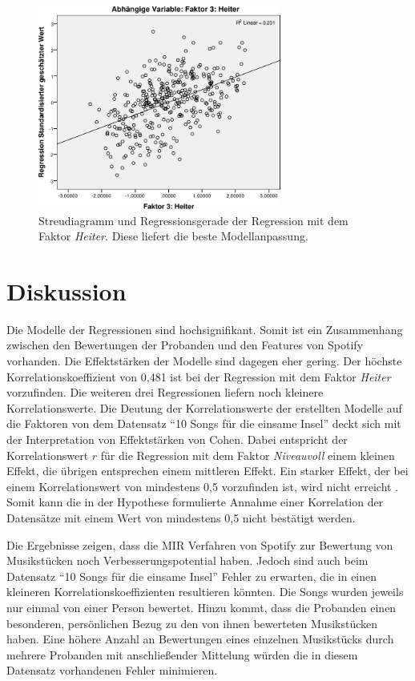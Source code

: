 \begin{figure}[hbt]
    \begin{center}
        \includegraphics[width=8cm]{images/StreudiagrammFak3.pdf}
    \end{center}
    \caption{Streudiagramm und Regressionsgerade der Regression mit dem Faktor \textit{Heiter}. Diese liefert die beste Modellanpassung.}
    \label{fig:Faktor3}
\end{figure}

\section*{Diskussion}
\label{sec:Diskussion}


Die Modelle der Regressionen sind hochsignifikant.
Somit ist ein Zusammenhang zwischen den Bewertungen der Probanden und den Features von Spotify vorhanden.
Die Effektstärken der Modelle sind dagegen eher gering. 
Der höchste Korrelationskoeffizient von 0,481 ist bei der Regression mit dem Faktor \textit{Heiter} vorzufinden. Die weiteren drei Regressionen liefern noch kleinere Korrelationswerte.
Die Deutung der Korrelationswerte der erstellten Modelle auf die Faktoren von dem Datensatz "`10 Songs für die einsame Insel"' deckt sich mit der Interpretation von Effektstärken von Cohen.
Dabei entspricht der Korrelationswert $r$ für die Regression mit dem Faktor \textit{Niveauvoll} einem kleinen Effekt, die übrigen entsprechen einem mittleren Effekt. 
Ein starker Effekt, der bei einem Korrelationswert von mindestens 0,5 vorzufinden ist, wird nicht erreicht \cite{cohen1988}.
Somit kann die in der Hypothese formulierte Annahme einer Korrelation der Datensätze mit einem Wert von mindestens 0,5 nicht bestätigt werden. 

Die Ergebnisse zeigen, dass die MIR Verfahren von Spotify zur Bewertung von Musikstücken noch Verbesserungspotential haben.
Jedoch sind auch beim Datensatz "`10 Songs für die einsame Insel"' Fehler zu erwarten, die in einen kleineren Korrelationskoeffizienten resultieren könnten.
Die Songs wurden jeweils nur einmal von einer Person bewertet.
Hinzu kommt, dass die Probanden einen besonderen, persönlichen Bezug zu den von ihnen bewerteten Musikstücken haben.
Eine höhere Anzahl an Bewertungen eines einzelnen Musikstücks durch mehrere Probanden mit anschließender Mittelung würden die in diesem Datensatz vorhandenen Fehler minimieren.

